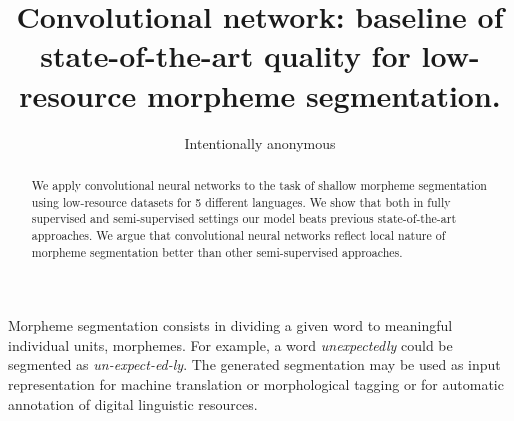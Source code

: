 \documentclass[11pt,a4paper]{article}
\title{Convolutional network: baseline of state-of-the-art quality for low-resource morpheme segmentation.}
\author{Intentionally anonymous}
\date{}
\begin{document}
\maketitle
\begin{abstract}
  We apply convolutional neural networks to the task of shallow morpheme segmentation using low-resource datasets for 5 different languages. We show that both in fully supervised and semi-supervised settings our model beats previous state-of-the-art approaches. We argue that convolutional neural networks reflect local nature of morpheme segmentation better than other semi-supervised approaches.
\end{abstract}

Morpheme segmentation consists in dividing a given word to meaningful individual units, morphemes. For example, a word \textit{unexpectedly} could be segmented as \textit{un-expect-ed-ly}. The generated segmentation may be used as input representation for machine translation \cite{Mager2018b} or morphological tagging \cite{Matteson2018} or for automatic annotation of digital linguistic resources. 
\end{document}
